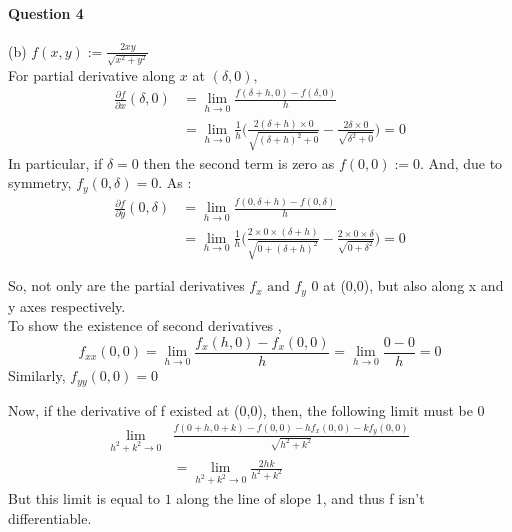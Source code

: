 \documentclass[20pt,a4paper]{extarticle} %
\theoremstyle{definition}
\theoremstyle{definition}
\begin{document}
\paragraph{Question 4} %
(b) $f(x,y):= \frac{2xy}{\sqrt{x^2+y^2}}$ \\
For partial derivative along $x$ at $(\delta,0),$
\begin{equation*}
	\begin{split}
		\frac{\partial f}{\partial x}(\delta,0) & =\lim_{h \to 0} \frac{f(\delta +h,0)-f(\delta,0)}{h}	\\
							&=\lim_{h \to 0} \frac{1}{h} \big( \frac{2(\delta+h) \times 0}
								{\sqrt{(\delta+h)^2+0}}
							- \frac{2\delta \times 0}{\sqrt{\delta^2+0}}\big)=0
	\end{split}
\end{equation*}
In particular, if $\delta=0$ then the second term is zero as $f(0,0):=0$. And, due to symmetry,
$f_y(0,\delta)=0$. As :
\begin{equation*}
	\begin{split}
		\frac{\partial f}{\partial y}(0,\delta) & =\lim_{h \to 0} \frac{f(0,\delta +h)-f(0,\delta)}{h}	\\
							&=\lim_{h \to 0} \frac{1}{h}\big(\frac{2 \times 0 \times (\delta+h)}
								{\sqrt{0+(\delta+h)^2}}
							- \frac{2\times 0 \times \delta}{\sqrt{0+\delta^2}}\big)=0
	\end{split}
\end{equation*}

So, not only are the partial derivatives $f_x \text{ and } f_y$ 0 at (0,0), but also along x and y
axes respectively.\\
To show the existence of second derivatives ,
\begin{equation*}
	f_{xx}(0,0) = \lim_{h \to 0} \frac{f_x(h,0)-f_x(0,0)}{h}=\lim_{h \to 0} \frac{0-0}{h}=0
\end{equation*}
Similarly, $f_{yy}(0,0)=0$

Now, if the derivative of f existed at (0,0), then, the following limit must be 0
\begin{equation*}
	\begin{split}
		\lim_{h^2+k^2 \to 0}&\frac{f(0+h,0+k)-f(0,0) -hf_x(0,0)-kf_y(0,0)
		}{\sqrt{h^2+k^2}} \\
		&=\lim_{h^2+k^2 \to 0} \frac{2hk}{h^2+k^2}
	\end{split}
\end{equation*}
But this limit is equal to $1$ along the line of slope 1, and thus f isn't differentiable.
\newpage
\end{document}
